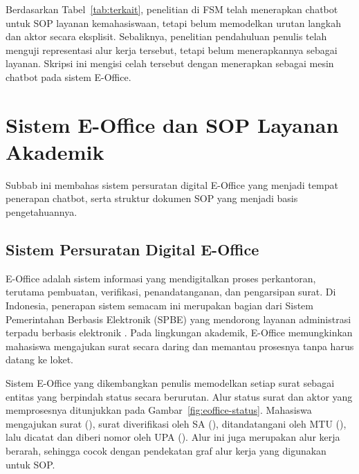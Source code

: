 Berdasarkan Tabel~\ref{tab:terkait}, penelitian di FSM telah menerapkan chatbot untuk SOP layanan kemahasiswaan, tetapi belum memodelkan urutan langkah dan aktor secara eksplisit. Sebaliknya, penelitian pendahuluan penulis telah menguji representasi alur kerja tersebut, tetapi belum menerapkannya sebagai layanan. Skripsi ini mengisi celah tersebut dengan menerapkan \wgr{} sebagai mesin chatbot pada sistem E-Office.

\section{Sistem E-Office dan SOP Layanan Akademik}
\label{sec:eoffice}
Subbab ini membahas sistem persuratan digital E-Office yang menjadi tempat penerapan chatbot, serta struktur dokumen SOP yang menjadi basis pengetahuannya.

\subsection{Sistem Persuratan Digital E-Office}
E-Office adalah sistem informasi yang mendigitalkan proses perkantoran, terutama pembuatan, verifikasi, penandatanganan, dan pengarsipan surat. Di Indonesia, penerapan sistem semacam ini merupakan bagian dari Sistem Pemerintahan Berbasis Elektronik (SPBE) yang mendorong layanan administrasi terpadu berbasis elektronik \parencite{perpres95_2018}. Pada lingkungan akademik, E-Office memungkinkan mahasiswa mengajukan surat secara daring dan memantau prosesnya tanpa harus datang ke loket.

Sistem E-Office yang dikembangkan penulis memodelkan setiap surat sebagai entitas yang berpindah status secara berurutan. Alur status surat dan aktor yang memprosesnya ditunjukkan pada Gambar~\ref{fig:eoffice-status}. Mahasiswa mengajukan surat (), surat diverifikasi oleh SA (), ditandatangani oleh MTU (), lalu dicatat dan diberi nomor oleh UPA (). %
Alur ini juga merupakan alur kerja berarah, sehingga cocok dengan pendekatan graf alur kerja yang digunakan untuk SOP.

